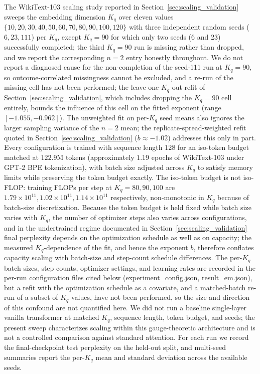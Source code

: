 \documentclass[11pt]{article}
\begin{document}
The WikiText-103 scaling study reported in Section~\ref{sec:scaling_validation} sweeps the embedding dimension $K_q$ over eleven values $\{10, 20, 30, 40, 50, 60, 70, 80, 90, 100, 120\}$ with three independent random seeds ($6, 23, 111$) per $K_q$, except $K_q = 90$ for which only two seeds (6 and 23) successfully completed; the third $K_q = 90$ run is missing rather than dropped, and we report the corresponding $n = 2$ entry honestly throughout. We do not report a diagnosed cause for the non-completion of the seed-111 run at $K_q = 90$, so outcome-correlated missingness cannot be excluded, and a re-run of the missing cell has not been performed; the leave-one-$K_q$-out refit of Section~\ref{sec:scaling_validation}, which includes dropping the $K_q = 90$ cell entirely, bounds the influence of this cell on the fitted exponent (range $[-1.055, -0.962]$). The unweighted fit on per-$K_q$ seed means also ignores the larger sampling variance of the $n = 2$ mean; the replicate-spread-weighted refit quoted in Section~\ref{sec:scaling_validation} ($b \approx -1.02$) addresses this only in part. Every configuration is trained with sequence length $128$ for an iso-token budget matched at $122.9$M tokens (approximately $1.19$ epochs of WikiText-103 under GPT-2 BPE tokenization), with batch size adjusted across $K_q$ to satisfy memory limits while preserving the token budget exactly. The iso-token budget is not iso-FLOP: training FLOPs per step at $K_q = 80, 90, 100$ are $1.79\times 10^{11}, 1.02\times 10^{11}, 1.14\times 10^{11}$ respectively, non-monotonic in $K_q$ because of batch-size discretization. Because the token budget is held fixed while batch size varies with $K_q$, the number of optimizer steps also varies across configurations, and in the undertrained regime documented in Section~\ref{sec:scaling_validation} final perplexity depends on the optimization schedule as well as on capacity; the measured $K_q$-dependence of the fit, and hence the exponent $b$, therefore conflates capacity scaling with batch-size and step-count schedule differences. The per-$K_q$ batch sizes, step counts, optimizer settings, and learning rates are recorded in the per-run configuration files cited below (\url{experiment_config.json}, \url{result_em.json}), but a refit with the optimization schedule as a covariate, and a matched-batch re-run of a subset of $K_q$ values, have not been performed, so the size and direction of this confound are not quantified here. We did not run a baseline single-layer vanilla transformer at matched $K_q$, sequence length, token budget, and seeds; the present sweep characterizes scaling within this gauge-theoretic architecture and is not a controlled comparison against standard attention. For each run we record the final-checkpoint test perplexity on the held-out split, and multi-seed summaries report the per-$K_q$ mean and standard deviation across the available seeds.
\end{document}
